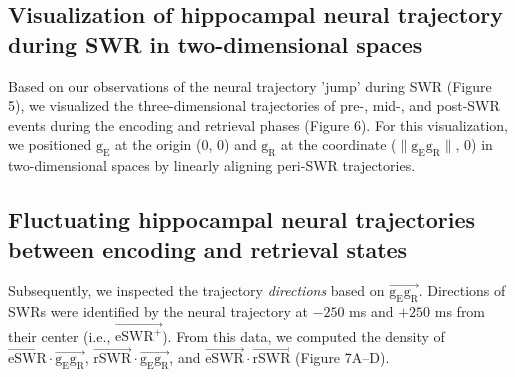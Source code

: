 \subsection{Visualization of hippocampal neural trajectory during SWR in two-dimensional spaces}
Based on our observations of the neural trajectory 'jump' during SWR (Figure 5), we visualized the three-dimensional trajectories of pre-, mid-, and post-SWR events during the encoding and retrieval phases (Figure 6). For this visualization, we positioned $\mathrm{g_{E}}$ at the origin (0, 0) and $\mathrm{g_{R}}$ at the coordinate ($\mathrm{\lVert g_{E}g_{R} \rVert}$, 0) in two-dimensional spaces by linearly aligning peri-SWR trajectories. 

\subsection{Fluctuating hippocampal neural trajectories between encoding and retrieval states}
Subsequently, we inspected the trajectory \textit{directions} based on $\overrightarrow{\mathrm{g_{E}g_{R}}}$. Directions of SWRs were identified by the neural trajectory at $-250$ ms and $+250$ ms from their center (i.e., $\overrightarrow{\mathrm{eSWR^+}}$). From this data, we computed the density of $\overrightarrow{\mathrm{eSWR}} \cdot \overrightarrow{\mathrm{g_{E}g_{R}}}$, $\overrightarrow{\mathrm{rSWR}} \cdot \overrightarrow{\mathrm{g_{E}g_{R}}}$, and $\overrightarrow{\mathrm{eSWR}} \cdot \overrightarrow{\mathrm{rSWR}}$ (Figure 7A--D).